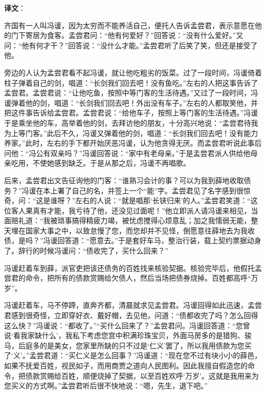 \documentclass[12pt,UTF-8,openany]{ctexbook}
\begin{document}
\newpage

\textbf{译文}：

\vspace{1em}

\begin{normalsize}
    
    齐国有一人叫冯谖，因为太穷而不能养活自己，便托人告诉孟尝君，表示意愿在他的门下寄居为食客。孟尝君问：“他有何爱好？”回答说：“没有什么爱好。”又问：“他有何才干？”回答说：“没什么才能。”孟尝君听了后笑了笑，但还是接受了他。
    
    旁边的人认为孟尝君看不起冯谖，就让他吃粗劣的饭菜。过了一段时间，冯谖倚着柱子弹着自己的剑，唱道：“长剑我们回去吧！没有鱼吃。”左右的人把这事告诉了孟尝君。孟尝君说：“让他吃鱼，按照中等门客的生活待遇。”又过了一段时间，冯谖弹着他的剑，唱道：“长剑我们回去吧！外出没有车子。”左右的人都取笑他，并把这件事告诉给孟尝君。孟尝君说：“给他车子，按照上等门客的生活待遇。”冯谖于是乘坐他的车，高举着他的剑，去拜访他的朋友，十分高兴地说：“孟尝君待我为上等门客。”此后不久，冯谖又弹着他的剑，唱道：“长剑我们回去吧！没有能力养家。”此时，左右的手下都开始厌恶冯谖，认为他贪得无厌。而孟尝君听说此事后问他：“冯公有双亲吗？”冯谖回答说：“家中有老母亲。”于是孟尝君派人供给他母亲吃用，不使她感到缺乏。于是从那之后，冯谖不再唱歌。
    
    后来，孟尝君出文告征询他的门客：“谁熟习会计的事？可以为我到薛地收取债务？”冯谖在本上署了自己的名，并签上一个“能”字。孟尝君见了名字感到很惊奇，问：“这是谁呀？”左右的人说：“就是唱那‘长铗归来’的人。”孟尝君笑道：“这位客人果真有才能，我亏待了他，还没见过面呢！”他立即派人请冯谖来相见，当面赔礼道：“我被琐事搞得精疲力竭，被忧虑搅得心烦意乱；加之我懦弱无能，整天埋在国家大事之中，以致怠慢了您，而您却并不见怪，倒愿意往薛地去为我收债，是吗？”冯谖回答道：“愿意去。”于是套好车马，整治行装，载上契约票据动身了。辞行的时候冯谖问：“债收完了，买什么回来？”
    
    冯谖赶着车到薛，派官吏把该还债务的百姓找来核验契据。核验完毕后，他假托孟尝君的命令，把所有的债款赏赐给欠债人，然后当场把债券烧掉。百姓都高呼“万岁”。
    
    冯谖赶着车，马不停蹄，直奔齐都，清晨就求见孟尝君。冯谖回得如此迅速，孟尝君感到很奇怪，立即穿好衣、戴好帽，去见他，问道：“债都收完了吗？怎么回得这么快？”冯谖说：“都收了。”“买什么回来了？”孟尝君问。冯谖回答道：“您曾说‘看我家缺什么’，我私下考虑您宫中积满珍珠宝贝，外面马房多的是猎狗、骏马，后庭多的是美女，您家里所缺的只不过是‘仁义’罢了，所以我用债款为您买了‘义’。”孟尝君道：“买仁义是怎么回事？”冯谖道：“现在您不过有块小小的薛邑，如果不抚爱百姓，视民如子，而用商贾之道向人民图利。因此我擅自假造您的命令，把债款赏赐给百姓，顺便烧掉了契据，以至百姓欢呼‘万岁’。这就是我用来为您买义的方式啊。”孟尝君听后很不快地说：“嗯，先生，退下吧。”
    

\end{normalsize}
\end{document}
